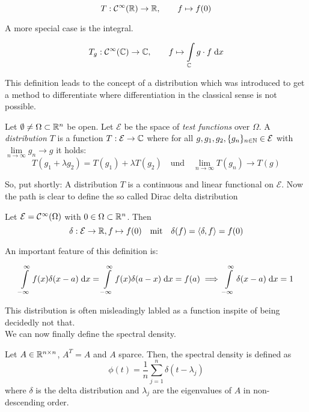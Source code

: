 \begin{equation} \label{eq:functional_example_simple}
    T: \mathcal{C}^{\infty}(\mathbb{R}) \to \mathbb{R}, \qquad f \mapsto f(0)
\end{equation}

A more special case is the integral.

\begin{equation} \label{eq:functional_example_integral}
    T_g: \mathcal{C}^{\infty}(\mathbb{C}) \to \mathbb{C}, \qquad f \mapsto \int\limits_{\mathbb{C}} g \cdot f \;\mathrm{d}x
\end{equation}

This definition leads to the concept of a distribution which was introduced to get a method to differentiate where differentiation in the classical sense is not possible.

\begin{definition}[distribution]
    Let $\emptyset \neq \Omega \subset \mathbb{R}^n$ be open.
    Let $\mathcal{E}$ be the space of \emph{test functions} over $\Omega$.
    A \emph{distribution} $T$ is a function $T: \mathcal{E} \to \mathbb{C}$ where for all
    $g, g_1, g_2, \{g_n\}_{n \in \mathbb{N}} \in \mathcal{E}$
    with $\lim\limits_{n \to \infty} g_n \to g$ it holds:
    $$T(g_1 + \lambda g_2) = T(g_1) + \lambda T(g_2) \quad \text{und}\quad \lim\limits_{n \to \infty} T(g_n) \to T(g)$$
\end{definition}

So, put shortly: A distribution $T$ is a continuous and linear functional on $\mathcal{E}$.
Now the path is clear to define the so called Dirac delta distribution

\begin{definition}
    Let $\mathcal{E} = \mathcal{C}^{\infty}(\Omega)$ with $0 \in \Omega \subset \mathbb{R}^n$.
    Then
    $$\delta: \mathcal{E} \to \mathbb{R}, f \mapsto f(0) \quad \text{mit} \quad \delta(f) = \langle \delta, f \rangle = f(0)$$
\end{definition}

An important feature of this definition is:

$$\int\limits_{-\infty}^{\infty} f(x) \delta(x-a) \;\mathrm{d}x = \int\limits_{-\infty}^{\infty} f(x) \delta(a-x) \;\mathrm{d}x = f(a) \implies \int\limits_{-\infty}^{\infty} \delta(x-a) \;\mathrm{d}x = 1$$

This distribution is often misleadingly labled as a function inspite of being decidedly not that.\\
We can now finally define the spectral density.

\begin{definition} 
    Let $A \in \mathbb{R}^{n \times n}$, $A^T = A$ and $A$ sparce.
    Then, the spectral density is defined as
    $$\phi(t) = \frac{1}{n} \sum_{j=1}^{n} \delta(t - \lambda_j)$$
    where $\delta$ is the delta distribution and $\lambda_j$ are the eigenvalues of $A$ in non-descending order.
\end{definition}

